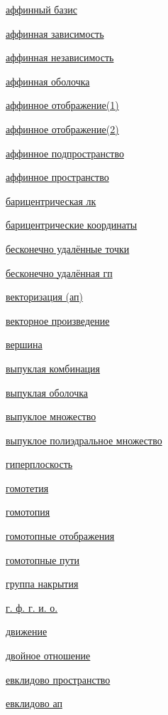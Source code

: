 \documentclass[a4paper,100pt]{article}
\theoremstyle{indented}
\theoremstyle{definition}
\theoremstyle{remark}
\begin{document}
\begin{multicols}{2}

    \hyperlink{s24}{аффинный базис} \ 

    \hyperlink{s22}{аффинная зависимость} \ 
    
    \hyperlink{s23}{аффинная независимость} \ 
    
    \hyperlink{s21}{аффинная оболочка} \ 
    
    \hyperlink{s26}{аффинное отображение(1)} \ 
    
    \hyperlink{s28}{аффинное отображение(2)} \ 
    
    \hyperlink{s13}{аффинное подпространство} \ 
    
    \hyperlink{s1}{аффинное пространство} \
    
    \hyperlink{s8}{барицентрическая лк} \
    
    \hyperlink{s25}{барицентрические координаты} \ 
    
    \hyperlink{s38}{бесконечно удалённые точки} \ 

    \hyperlink{s39}{бесконечно удалённая гп} \
    
    \hyperlink{s6}{векторизация (ап)} \ 

    \hyperlink{s83}{векторное произведение} \ 

    \hyperlink{s49}{вершина} \ 

    \hyperlink{s91}{выпуклая комбинация} \ 

    \hyperlink{s90}{выпуклая оболочка} \ 

    \hyperlink{s89}{выпуклое множество} \ 

    \hyperlink{s102}{выпуклое полиэдральное множество} \ 
    
    \hyperlink{s19}{гиперплоскость} \ 
    
    \hyperlink{s29}{гомотетия} \ 

    \hyperlink{s108}{гомотопия} \ 

    \hyperlink{s107}{гомотопные отображения} \ 

    \hyperlink{s110}{гомотопные пути} \ 

    \hyperlink{s124}{группа накрытия} \ 

    \hyperlink{s114}{г. ф. г. и. о.} \ 

    \hyperlink{s86}{движение} \ 

    \hyperlink{s41}{двойное отношение} \

    \hyperlink{s54}{евклидово пространство} \ 

    \hyperlink{s84}{евклидово ап} \ 


\end{multicols}
\end{document}
